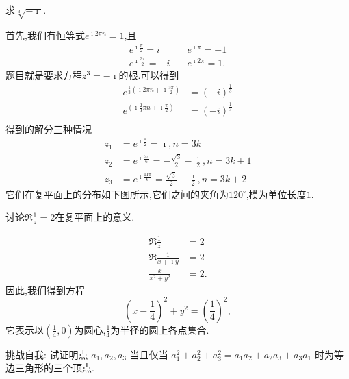 \begin{example}
    求$\sqrt[3]{-\imath}$.
\end{example}
\begin{solution}
    
    \begin{minipage}{0.7\textwidth}
        首先,我们有恒等式$e^{\imath 2\pi n} = 1$,且
        \begin{align*}
            e^{\imath \frac{\pi}{2}}  = i & \quad  e^{\imath \pi}  =-1 \\
            e^{\imath \frac{3\pi}{2}} = -i & \quad e^{\imath 2\pi} = 1.
        \end{align*}
    题目就是要求方程$z^3 =-\imath$的根.可以得到
        \begin{align*}
            e^{\frac{1}{3}(\imath 2\pi n + \imath \frac{3\pi}{2})} & = (-i)^{\frac{1}{3}} \\
            e^{(\imath \frac{2}{3}\pi n + \imath \frac{\pi}{2})}   & =  (-i)^{\frac{1}{3}} \\
        \end{align*}
    得到的解分三种情况
        \begin{align*}
            z_1 &=e^{\imath \frac{\pi}{2}} = \imath , n = 3k \\
            z_2 &=e^{\imath \frac{7\pi}{6}} = -\frac{\sqrt{3}}{2} - \frac{\imath}{2} , n = 3k +1 \\
            z_3 &=e^{\imath \frac{11\pi}{6}} = \frac{\sqrt{3}}{2} - \frac{\imath}{2} , n = 3k +2 
        \end{align*}
    它们在复平面上的分布如下图所示,它们之间的夹角为$120^\circ$,模为单位长度$1$.
    \end{minipage}
    \begin{minipage}{0.3\textwidth}
            
    \end{minipage}
    
\end{solution}

\begin{example}
讨论$\Re \frac{1}{z} = 2$在复平面上的意义.
\end{example}
\begin{solution}
    \begin{align*}
        \Re \frac{1}{z} &= 2\\
        \Re \frac{1}{x+\imath y} &  = 2 \\
        \frac{x}{x^2 +y^2} & = 2 .
    \end{align*}
因此,我们得到方程
\[
    (x-\frac{1}{4})^2 + y^2 = \left( \frac{1}{4}\right)^2,
\]
它表示以$(\frac{1}{4},0)$为圆心,$\frac{1}{4}$为半径的圆上各点集合.
\end{solution}
        

\begin{note}
    挑战自我: 试证明点 $a_1, a_2, a_3$ 当且仅当 
    $a_1^2+a_2^2+a_3^2=a_1 a_2+a_2 a_3+a_3 a_1$ 时为等边三角形的三个顶点.    
\end{note}


